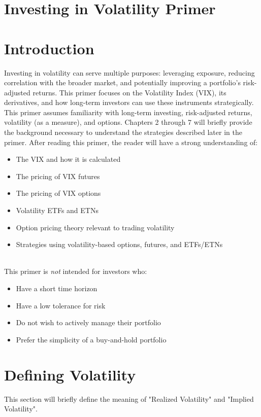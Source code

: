 \documentclass[11pt, oneside]{book}
\begin{document}
\frontmatter
%
\chapter*{\Huge \center Investing in Volatility Primer }
\tableofcontents
\mainmatter
\chapter{Introduction} \label{Intro}
Investing in volatility can serve multiple purposes: leveraging exposure, reducing correlation with the broader market, and potentially improving a portfolio’s risk-adjusted returns. This primer focuses on the Volatility Index (VIX), its derivatives, and how long-term investors can use these instruments strategically. This primer assumes familiarity with long-term investing, risk-adjusted returns, volatility (as a measure), and options. Chapters 2 through 7 will briefly provide the background necessary to understand the strategies described later in the primer. After reading this primer, the reader will have a strong understanding of:
\begin{itemize}
    \item The VIX and how it is calculated
    \item The pricing of VIX futures
    \item The pricing of VIX options
    \item Volatility ETFs and ETNs
    \item Option pricing theory relevant to trading volatility
    \item Strategies using volatility-based options, futures, and ETFs/ETNs
\end{itemize}\  \\
This primer is \textit{not} intended for investors who:
\begin{itemize}
    \item Have a short time horizon
    \item Have a low tolerance for risk
    \item Do not wish to actively manage their portfolio
    \item Prefer the simplicity of a buy-and-hold portfolio
\end{itemize}

\chapter{Defining Volatility} \label{DefiningVolatility}
This section will briefly define the meaning of "Realized Volatility" and "Implied Volatility".
\end{document}
